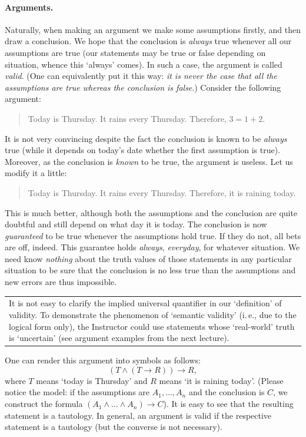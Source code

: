 \documentclass[12pt,notitlepage]{article}
\theoremstyle{plain}
\theoremstyle{definition}
\theoremstyle{plain}
\newcommand{\1}{\mathbf{1}}
\newcommand{\0}{\mathbf{0}}
\newcommand{\mcomm}[1]{
\medskip\noindent\begin{tabular}{| l}
\parbox{0.99\textwidth}{{\small
#1 }}\end{tabular}
\smallskip}
\begin{document}
\paragraph{Arguments.} Naturally, when making an argument we make some assumptions firstly, and then draw a conclusion. We hope that the conclusion is \emph{always} true whenever all our assumptions are true (our statements may be true or false depending on situation, whence this `always' comes). In such a case, the argument is called \emph{valid}. (One can equivalently put it this way: \emph{it is never the case that all the assumptions are true whereas the conclusion is false}.) Consider the following argument:
\begin{quote}
Today is Thursday. It rains every Thursday. Therefore, $3 = 1 + 2$.
\end{quote}
It is not very convincing despite the fact the conclusion is known to be \emph{always} true (while it depends on today's date whether the first assumption is true). Moreover, as the conclusion is \emph{known} to be true, the argument is useless. Let us modify it a little:
\begin{quote}
Today is Thursday. It rains every Thursday. Therefore, it is raining today.
\end{quote}
This is much better, although both the assumptions and the conclusion are quite doubtful and still depend on what day it is today. The conclusion is now \emph{guaranteed} to be true whenever the assumptions hold true. If they do not, all bets are off, indeed. This guarantee holds \emph{always}, \emph{everyday}, for whatever situation. We need know \emph{nothing} about the truth values of those statements in any particular situation to be sure that the conclusion is no less true than the assumptions and new errors are thus impossible. 

\mcomm{It is not easy to clarify the implied universal quantifier in our `definition' of validity. To demonstrate the phenomenon of `semantic validity' (i.\,e., due to the logical form only), the Instructor could use statements whose `real-world' truth is `uncertain' (see argument examples from the next lecture).}

One can render this argument into symbols as follows:
$$(T \wedge (T \to R)) \to R,$$
where $T$ means `today is Thursday' and $R$ means `it is raining today'. (Please notice the model: if the assumptions are $A_1, \ldots, A_n$ and the conclusion is $C$, we construct the formula $(A_1 \wedge  \ldots \wedge A_n) \to C$). It is easy to see that the resulting statement is a tautology. In general, an argument is valid if the respective statement is a tautology (but the converse is not necessary).
\end{document}
